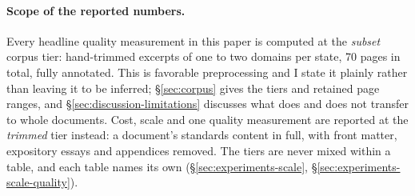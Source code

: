 \paragraph{Scope of the reported numbers.} Every headline quality measurement
in this paper is computed at the \emph{subset} corpus tier: hand-trimmed
excerpts of one to two domains per state, 70 pages in total, fully annotated.
This is favorable preprocessing and I state it plainly rather than leaving it to
be inferred; \S\ref{sec:corpus} gives the tiers and retained page ranges, and
\S\ref{sec:discussion-limitations} discusses what does and does not transfer to
whole documents. Cost, scale and one quality measurement are reported at the
\emph{trimmed} tier instead: a document's standards content in full, with front
matter, expository essays and appendices removed. The tiers are never mixed
within a table, and each table names its own
(\S\ref{sec:experiments-scale}, \S\ref{sec:experiments-scale-quality}).
